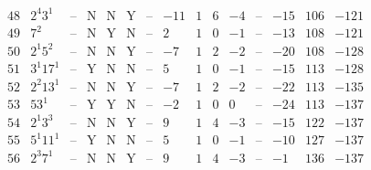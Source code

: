\documentclass[11pt,reqno,a4letter]{article}
\numberwithin{figure}{section}
\numberwithin{table}{section}
\theoremstyle{plain}
\numberwithin{theorem}{section}
\theoremstyle{definition}
\begin{document}
\begin{table}[h!]
\begin{equation*}
{\begin{array}{|cc|c|ccc|c|c|ccc|c|ccc}
 48 & 2^4 3^1 & \text{--} & \text{N} & \text{N} & \text{Y} & \text{--} & -11 & 1 & 6 & -4 & \text{--} & -15 & 106 & -121 \\
 49 & 7^2 & \text{--} & \text{N} & \text{Y} & \text{N} & \text{--} & 2 & 1 & 0 & -1 & \text{--} & -13 & 108 & -121 \\
 50 & 2^1 5^2 & \text{--} & \text{N} & \text{N} & \text{Y} & \text{--} & -7 & 1 & 2 & -2 & \text{--} & -20 & 108 & -128 \\
 51 & 3^1 17^1 & \text{--} & \text{Y} & \text{N} & \text{N} & \text{--} & 5 & 1 & 0 & -1 & \text{--} & -15 & 113 & -128 \\
 52 & 2^2 13^1 & \text{--} & \text{N} & \text{N} & \text{Y} & \text{--} & -7 & 1 & 2 & -2 & \text{--} & -22 & 113 & -135 \\
 53 & 53^1 & \text{--} & \text{Y} & \text{Y} & \text{N} & \text{--} & -2 & 1 & 0 & 0 & \text{--} & -24 & 113 & -137 \\
 54 & 2^1 3^3 & \text{--} & \text{N} & \text{N} & \text{Y} & \text{--} & 9 & 1 & 4 & -3 & \text{--} & -15 & 122 & -137 \\
 55 & 5^1 11^1 & \text{--} & \text{Y} & \text{N} & \text{N} & \text{--} & 5 & 1 & 0 & -1 & \text{--} & -10 & 127 & -137 \\
 56 & 2^3 7^1 & \text{--} & \text{N} & \text{N} & \text{Y} & \text{--} & 9 & 1 & 4 & -3 & \text{--} & -1 & 136 & -137 \\

\end{array}}
\end{equation*}
\end{table}
\end{document}
